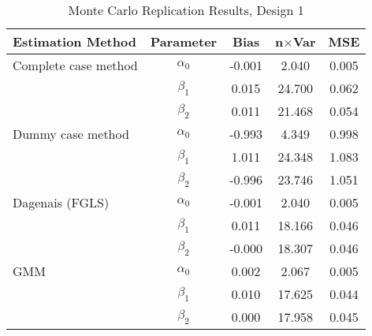\begin{table}
\centering
\caption{Monte Carlo Replication Results, Design 1}
\label{table:MCReplicationResultsDesign1}
\begin{tabular}{lcccc}
\toprule
Estimation Method & Parameter & Bias & n$\times$Var & MSE \\
\midrule
Complete case method & $\alpha_0$ & -0.001 & 2.040 & 0.005 \\
 & $\beta_1$ & 0.015 & 24.700 & 0.062 \\
 & $\beta_2$ & 0.011 & 21.468 & 0.054 \\
Dummy case method & $\alpha_0$ & -0.993 & 4.349 & 0.998 \\
 & $\beta_1$ & 1.011 & 24.348 & 1.083 \\
 & $\beta_2$ & -0.996 & 23.746 & 1.051 \\
Dagenais (FGLS) & $\alpha_0$ & -0.001 & 2.040 & 0.005 \\
 & $\beta_1$ & 0.011 & 18.166 & 0.046 \\
 & $\beta_2$ & -0.000 & 18.307 & 0.046 \\
GMM & $\alpha_0$ & 0.002 & 2.067 & 0.005 \\
 & $\beta_1$ & 0.010 & 17.625 & 0.044 \\
 & $\beta_2$ & 0.000 & 17.958 & 0.045 \\
\bottomrule
\end{tabular}
\end{table}
